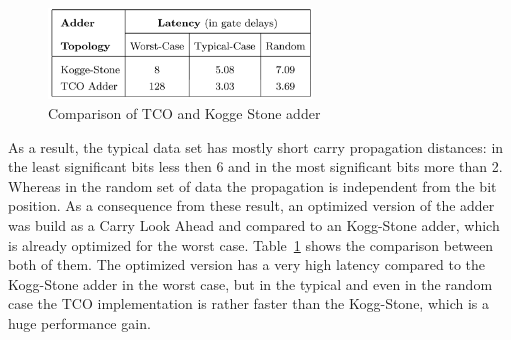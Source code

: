 \documentclass[12pt, a4paper]{article}
\begin{document}
	\begin{figure}[ht]
		\begin{center}
			\includegraphics[width=7cm]{pcomp.png}
		\end{center}
		\caption{Comparison of TCO and Kogge Stone adder\cite{austin}
			\label{fig:pcomp}}
	\end{figure}
	As a result, the typical data set has mostly short carry propagation distances: in the least significant bits less then 6 and in the most significant bits more than 2. Whereas in the random set of data the propagation is independent from the bit position. As a consequence from these result, an optimized version of the adder was build as a Carry Look Ahead and compared to an Kogg-Stone adder, which is already optimized for the worst case. Table~\ref{fig:pcomp} shows the comparison between both of them. The optimized version has a very high latency compared to the Kogg-Stone adder in the worst case, but in the typical and even in the random case the TCO implementation is rather faster than the Kogg-Stone, which is a huge performance gain.\cite{austin}
\end{document}
